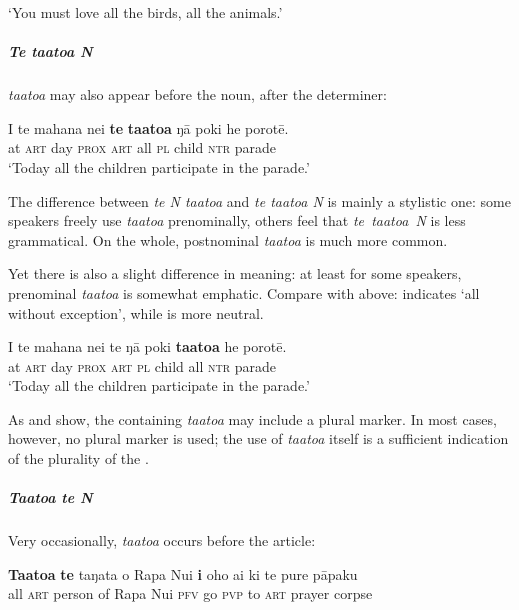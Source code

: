 \glt 
‘You must love all the birds, all the animals.’ \textstyleExampleref{[R213.053]} 
\z

\subparagraph{\textit{Te ta{\ꞌ}ato{\ꞌ}a N}} \textit{ta{\ꞌ}ato{\ꞌ}a} may also appear before the noun, after the determiner:

\ea\label{ex:4.51}
\gll {\ꞌ}I te mahana nei \textbf{te} \textbf{ta{\ꞌ}ato{\ꞌ}a} ŋā poki he porotē. \\
at \textsc{art} day \textsc{prox} \textsc{art} all \textsc{pl} child \textsc{ntr} parade \\

\glt
‘Today all the children participate in the parade.’ \textstyleExampleref{[R334.324]} 
\z

The difference between \textit{te N ta{\ꞌ}ato{\ꞌ}a} and \textit{te ta{\ꞌ}ato{\ꞌ}a N} is mainly a stylistic one: some speakers freely use \textit{ta{\ꞌ}ato{\ꞌ}a} prenominally, others feel that \textit{te~ta{\ꞌ}ato{\ꞌ}a~N} is less grammatical. On the whole, postnominal \textit{ta{\ꞌ}ato{\ꞌ}a} is much more common.

Yet there is also a slight difference in meaning: at least for some speakers, prenominal \textit{ta{\ꞌ}ato{\ꞌ}a} is somewhat emphatic. Compare  with  above:  indicates ‘all without exception’, while  is more neutral. 

\ea\label{ex:4.52}
\gll {\ꞌ}I te mahana nei te ŋā poki \textbf{ta{\ꞌ}ato{\ꞌ}a} he porotē. \\
at \textsc{art} day \textsc{prox} \textsc{art} \textsc{pl} child all \textsc{ntr} parade \\

\glt
‘Today all the children participate in the parade.’
\z

As  and  show, the  containing \textit{ta{\ꞌ}ato{\ꞌ}a} may include a plural marker. In most cases, however, no plural marker is used; the use of \textit{ta{\ꞌ}ato{\ꞌ}a} itself is a sufficient indication of the plurality of the . 

\subparagraph{\textit{Ta{\ꞌ}ato{\ꞌ}a te N}} Very occasionally, \textit{ta{\ꞌ}ato{\ꞌ}a} occurs before the article:

\ea\label{ex:4.53}
\gll \textbf{Ta{\ꞌ}ato{\ꞌ}a} \textbf{te} taŋata o Rapa Nui \textbf{i} oho ai ki te pure pāpaku\\
all \textsc{art} person of Rapa Nui \textsc{pfv} go \textsc{pvp} to \textsc{art} prayer corpse\\

